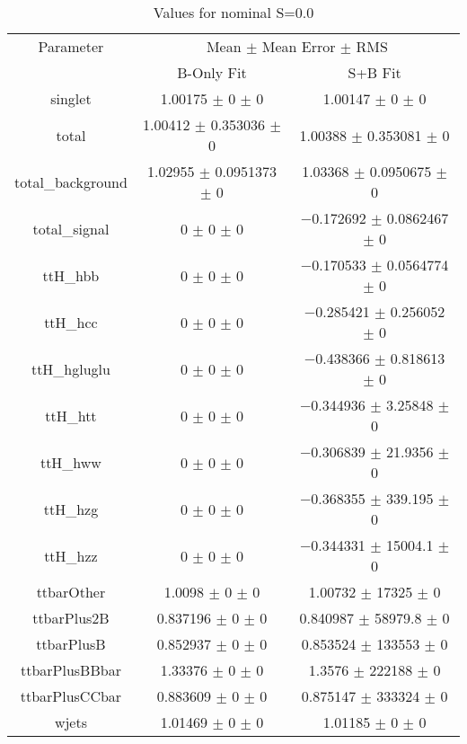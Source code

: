 \begin{table}
\centering
\caption{Values for nominal S=0.0}
\begin{tabular}{ccc}
\toprule
Parameter & \multicolumn{2}{c}{Mean $\pm$ Mean Error $\pm$ RMS}\\
 & B-Only Fit & S+B Fit\\
\midrule
singlet & \num{1.00175} $\pm$ \num{0} $\pm$ \num{0} & \num{1.00147} $\pm$ \num{0} $\pm$ \num{0}\\
total & \num{1.00412} $\pm$ \num{0.353036} $\pm$ \num{0} & \num{1.00388} $\pm$ \num{0.353081} $\pm$ \num{0}\\
total\_background & \num{1.02955} $\pm$ \num{0.0951373} $\pm$ \num{0} & \num{1.03368} $\pm$ \num{0.0950675} $\pm$ \num{0}\\
total\_signal & \num{0} $\pm$ \num{0} $\pm$ \num{0} & \num{-0.172692} $\pm$ \num{0.0862467} $\pm$ \num{0}\\
ttH\_hbb & \num{0} $\pm$ \num{0} $\pm$ \num{0} & \num{-0.170533} $\pm$ \num{0.0564774} $\pm$ \num{0}\\
ttH\_hcc & \num{0} $\pm$ \num{0} $\pm$ \num{0} & \num{-0.285421} $\pm$ \num{0.256052} $\pm$ \num{0}\\
ttH\_hgluglu & \num{0} $\pm$ \num{0} $\pm$ \num{0} & \num{-0.438366} $\pm$ \num{0.818613} $\pm$ \num{0}\\
ttH\_htt & \num{0} $\pm$ \num{0} $\pm$ \num{0} & \num{-0.344936} $\pm$ \num{3.25848} $\pm$ \num{0}\\
ttH\_hww & \num{0} $\pm$ \num{0} $\pm$ \num{0} & \num{-0.306839} $\pm$ \num{21.9356} $\pm$ \num{0}\\
ttH\_hzg & \num{0} $\pm$ \num{0} $\pm$ \num{0} & \num{-0.368355} $\pm$ \num{339.195} $\pm$ \num{0}\\
ttH\_hzz & \num{0} $\pm$ \num{0} $\pm$ \num{0} & \num{-0.344331} $\pm$ \num{15004.1} $\pm$ \num{0}\\
ttbarOther & \num{1.0098} $\pm$ \num{0} $\pm$ \num{0} & \num{1.00732} $\pm$ \num{17325} $\pm$ \num{0}\\
ttbarPlus2B & \num{0.837196} $\pm$ \num{0} $\pm$ \num{0} & \num{0.840987} $\pm$ \num{58979.8} $\pm$ \num{0}\\
ttbarPlusB & \num{0.852937} $\pm$ \num{0} $\pm$ \num{0} & \num{0.853524} $\pm$ \num{133553} $\pm$ \num{0}\\
ttbarPlusBBbar & \num{1.33376} $\pm$ \num{0} $\pm$ \num{0} & \num{1.3576} $\pm$ \num{222188} $\pm$ \num{0}\\
ttbarPlusCCbar & \num{0.883609} $\pm$ \num{0} $\pm$ \num{0} & \num{0.875147} $\pm$ \num{333324} $\pm$ \num{0}\\
wjets & \num{1.01469} $\pm$ \num{0} $\pm$ \num{0} & \num{1.01185} $\pm$ \num{0} $\pm$ \num{0}\\
\bottomrule
\end{tabular}
\end{table}